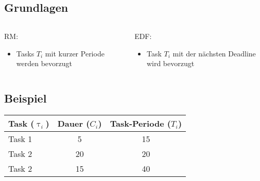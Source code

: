 \subsection{Grundlagen}
\begin{frame}{\subsecname}
		\begin{columns}[]
  			\begin{column}{0.5\textwidth}
				RM:
				\begin{itemize}
					\item Tasks $T_i$ mit kurzer Periode werden bevorzugt
				\end{itemize}

			\end{column}
  			\begin{column}{0.5\textwidth}
  				EDF:
				\begin{itemize}
					\item Task $T_i$ mit der nächsten Deadline wird bevorzugt
				\end{itemize}	
  			\end{column}
		\end{columns}
\end{frame}

\subsection{Beispiel}
\begin{frame}
	\begin{center}
		\begin{tabular}{l||c|c}
				Task ($\uptau_i$) & Dauer ($C_i$) & Task-Periode ($T_i$)\\\hline\hline
				Task 1 & 5 & 15\\
				Task 2 & 20 & 20\\
				Task 2 & 15 & 40\\
		\end{tabular}
	\end{center}
\end{frame}

\begin{frame}{\subsecname}
		
\end{frame}

\begin{frame}{\subsecname}
		
\end{frame}

\begin{frame}{\subsecname}
		
\end{frame}